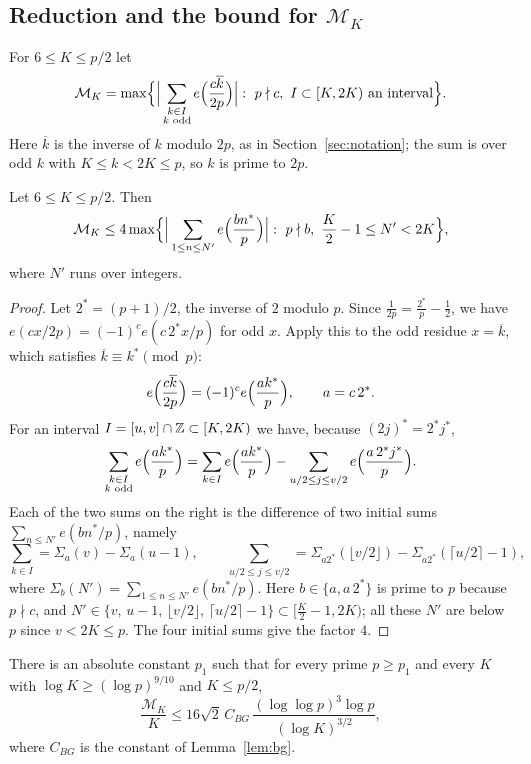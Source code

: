 \subsection{Reduction and the bound for \texorpdfstring{$\mathcal{M}_K$}{M\_K}}
For $6\le K\le p/2$ let
\begin{equation}\label{eq:MK}
\mathcal{M}_K=\max\Bigl\{\Big|\sum_{\substack{k\in I\\ k\text{ odd}}}e\Bigl(\frac{c\overline{k}}{2p}\Bigr)\Big|:\ p\nmid c,\
I\subset[K,2K)\text{ an interval}\Bigr\}.
\end{equation}
Here $\overline{k}$ is the inverse of $k$ modulo $2p$, as in Section~\ref{sec:notation}; the sum is over odd $k$ with $K\le k<2K\le p$, so $k$ is prime to $2p$.

\begin{lemma}\label{lem:reduction}
Let $6\le K\le p/2$. Then
\[
\mathcal{M}_K\le4\max\Bigl\{\Big|\sum_{1\le n\le N'}e\Bigl(\frac{bn^*}{p}\Bigr)\Big|:\ p\nmid b,\ \frac K2-1\le N'<2K\Bigr\},
\]
where $N'$ runs over integers.
\end{lemma}

\begin{proof}
Let $2^*=(p+1)/2$, the inverse of $2$ modulo $p$. Since $\frac1{2p}=\frac{2^*}{p}-\frac12$, we have
$e(cx/2p)=(-1)^ce(c\,2^*x/p)$ for odd $x$. Apply this to the odd residue $x=\overline{k}$, which satisfies $\overline{k}\equiv k^*\pmod p$:
\[
e\Bigl(\frac{c\overline{k}}{2p}\Bigr)=(-1)^ce\Bigl(\frac{ak^*}{p}\Bigr),\qquad a=c\,2^*.
\]
For an interval $I=[u,v]\cap\mathbb{Z}\subset[K,2K)$ we have, because $(2j)^*=2^*j^*$,
\[
\sum_{\substack{k\in I\\ k\text{ odd}}}e\Bigl(\frac{ak^*}{p}\Bigr)=\sum_{k\in I}e\Bigl(\frac{ak^*}{p}\Bigr)-\sum_{u/2\le j\le v/2}e\Bigl(\frac{a\,2^*j^*}{p}\Bigr).
\]
Each of the two sums on the right is the difference of two initial sums $\sum_{n\le N'}e(bn^*/p)$, namely
\[
\sum_{k\in I}=\Sigma_{a}(v)-\Sigma_{a}(u-1),\qquad \sum_{u/2\le j\le v/2}=\Sigma_{a2^*}(\lfloor v/2\rfloor)-\Sigma_{a2^*}(\lceil u/2\rceil-1),
\]
where $\Sigma_b(N')=\sum_{1\le n\le N'}e(bn^*/p)$. Here $b\in\{a,a\,2^*\}$ is prime to $p$ because $p\nmid c$, and
$N'\in\{v,\,u-1,\,\lfloor v/2\rfloor,\,\lceil u/2\rceil-1\}\subset[\frac K2-1,2K)$; all these $N'$ are below $p$ since $v<2K\le p$.
The four initial sums give the factor $4$.
\end{proof}

\begin{corollary}\label{cor:MK}
There is an absolute constant $p_1$ such that for every prime $p\ge p_1$ and every $K$ with $\log K\ge(\log p)^{9/10}$ and $K\le p/2$,
\[
\frac{\mathcal{M}_K}K\le16\sqrt2\,C_{BG}\,\frac{(\log\log p)^3\log p}{(\log K)^{3/2}},
\]
where $C_{BG}$ is the constant of Lemma~\ref{lem:bg}.
\end{corollary}

